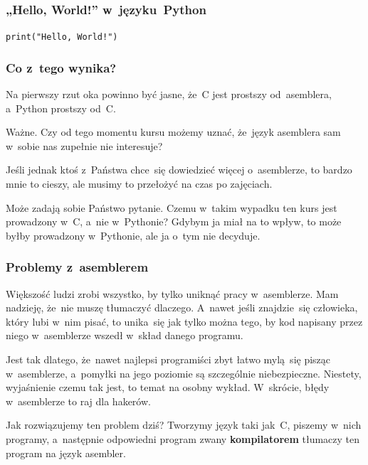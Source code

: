 \documentclass[10pt,t]{beamer}
\begin{document}
\begin{frame}
  \frametitle{„Hello, World!” w~języku~Python}


  \texttt{print("Hello, World!")}

\end{frame}





\begin{frame}
  \frametitle{Co z~tego wynika?}


  Na pierwszy rzut oka powinno być jasne, że~C jest prostszy od~asemblera,
  a~Python prostszy od~C.

  \alert{Ważne.} Czy od tego momentu kursu możemy uznać, że~język
  asemblera sam w~sobie nas zupełnie nie interesuje?

  Jeśli jednak ktoś z~Państwa chce~się dowiedzieć więcej o~asemblerze,
  to bardzo mnie to cieszy, ale musimy to przełożyć na czas po zajęciach.

  Może zadają sobie Państwo pytanie. Czemu w~takim wypadku ten kurs jest
  prowadzony w~C, a~nie w~Pythonie? Gdybym ja miał na to wpływ, to może
  byłby prowadzony w~Pythonie, ale ja o~tym nie decyduje.

\end{frame}





\begin{frame}
  \frametitle{Problemy z~asemblerem}


  Większość ludzi zrobi wszystko, by tylko uniknąć pracy w~asemblerze.
  Mam nadzieję, że~nie muszę tłumaczyć dlaczego.  A~nawet jeśli
  znajdzie~się człowieka, który lubi w~nim pisać, to unika~się jak tylko
  można tego, by kod napisany przez niego w~asemblerze wszedł w~skład
  danego programu.

  Jest tak dlatego, że~nawet najlepsi programiści zbyt łatwo mylą~się
  pisząc w~asemblerze, a~pomyłki na jego poziomie są szczególnie
  niebezpieczne. Niestety, wyjaśnienie czemu tak jest, to temat na osobny
  wykład. W~skrócie, błędy w~asemblerze to raj dla hakerów.

  Jak rozwiązujemy ten problem dziś? Tworzymy język taki jak~C, piszemy
  w~nich programy, a~następnie odpowiedni program zwany
  \textbf{kompilatorem} tłumaczy ten program na język asembler.

\end{frame}
\end{document}
